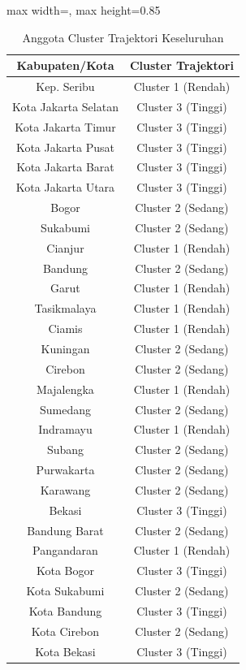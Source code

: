 \begin{table}[H]
\centering
\caption{Anggota Cluster Trajektori Keseluruhan} \label{tab:app1clustermembers}
\begin{adjustbox}{max width=\textwidth, max height=0.85\textheight}
\begin{tabular}{|c|c|}
\hline
\textbf{Kabupaten/Kota} & \textbf{Cluster Trajektori} \\
\hline
Kep. Seribu & Cluster 1 (Rendah) \\
Kota Jakarta Selatan & Cluster 3 (Tinggi) \\
Kota Jakarta Timur & Cluster 3 (Tinggi) \\
Kota Jakarta Pusat & Cluster 3 (Tinggi) \\
Kota Jakarta Barat & Cluster 3 (Tinggi) \\
Kota Jakarta Utara & Cluster 3 (Tinggi) \\
Bogor & Cluster 2 (Sedang) \\
Sukabumi & Cluster 2 (Sedang) \\
Cianjur & Cluster 1 (Rendah) \\
Bandung & Cluster 2 (Sedang) \\
Garut & Cluster 1 (Rendah) \\
Tasikmalaya & Cluster 1 (Rendah) \\
Ciamis & Cluster 1 (Rendah) \\
Kuningan & Cluster 2 (Sedang) \\
Cirebon & Cluster 2 (Sedang) \\
Majalengka & Cluster 1 (Rendah) \\
Sumedang & Cluster 2 (Sedang) \\
Indramayu & Cluster 1 (Rendah) \\
Subang & Cluster 2 (Sedang) \\
Purwakarta & Cluster 2 (Sedang) \\
Karawang & Cluster 2 (Sedang) \\
Bekasi & Cluster 3 (Tinggi) \\
Bandung Barat & Cluster 2 (Sedang) \\
Pangandaran & Cluster 1 (Rendah) \\
Kota Bogor & Cluster 3 (Tinggi) \\
Kota Sukabumi & Cluster 2 (Sedang) \\
Kota Bandung & Cluster 3 (Tinggi) \\
Kota Cirebon & Cluster 2 (Sedang) \\
Kota Bekasi & Cluster 3 (Tinggi) \\

\end{tabular}
\end{adjustbox}
\end{table}
